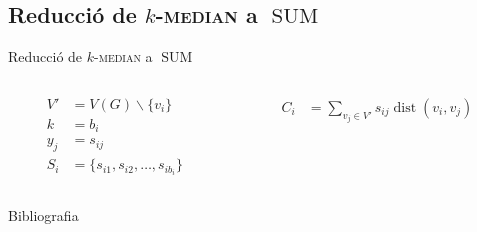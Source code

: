 \documentclass[aspectratio=169]{beamer}
\DeclareMathOperator{\dist}{dist}
\DeclareMathOperator{\SUM}{SUM}
\newcommand{\kmedian}{\texorpdfstring{$k$}{k}-\textsc{median}\xspace}
\begin{document}
\subsection{Reducció de \kmedian a \texorpdfstring{$\SUM$}{SUM}}
\begin{frame}{Reducció de \kmedian a $\SUM$}

\begin{columns}
\begin{column}{0.49\textwidth}
\begin{align*}
    V' &= V(G) \backslash \{v_i \} \\
    k &= b_i \\
    y_j &= s_{ij} \\
    S_i &= \{s_{i1}, s_{i2}, \dots, s_{ib_i}\}
\end{align*}
\end{column}

\begin{column}{0.49\textwidth}
\begin{align*}
    C_i &= \sum _{v_j \in V'} s_{ij} \dist(v_i, v_j) \\
\end{align*}
\end{column}

\end{columns}

\end{frame}


\begin{frame}{Bibliografia}
\printbibliography
\end{frame}
\end{document}
